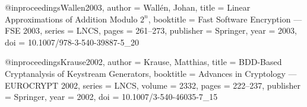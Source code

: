@inproceedings{Wallen2003,
  author    = {Wall{\'e}n, Johan},
  title     = {Linear Approximations of Addition Modulo $2^n$},
  booktitle = {Fast Software Encryption --- FSE 2003},
  series    = {LNCS},
  pages     = {261--273},
  publisher = {Springer},
  year      = {2003},
  doi       = {10.1007/978-3-540-39887-5_20}
}

@inproceedings{Krause2002,
  author    = {Krause, Matthias},
  title     = {{BDD}-Based Cryptanalysis of Keystream Generators},
  booktitle = {Advances in Cryptology --- EUROCRYPT 2002},
  series    = {LNCS},
  volume    = {2332}, %
  pages     = {222--237},
  publisher = {Springer},
  year      = {2002},
  doi       = {10.1007/3-540-46035-7_15}
}
